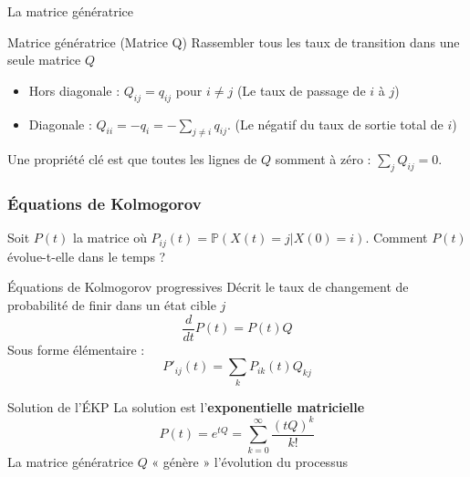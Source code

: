 \documentclass[aspectratio=169]{beamer}\usepackage[]{graphicx}\usepackage[]{xcolor}
\begin{document}
\begin{frame}{La matrice génératrice}
    \begin{block}{Matrice génératrice (Matrice Q)}
        Rassembler tous les taux de transition dans une seule matrice $Q$
        \begin{itemize}
            \item Hors diagonale : $Q_{ij} = q_{ij}$ pour $i \neq j$ (Le taux de passage de $i$ à $j$)
            \item Diagonale : $Q_{ii} = -q_i = -\sum_{j \neq i} q_{ij}$. (Le négatif du taux de sortie total de $i$)
        \end{itemize}
        Une propriété clé est que toutes les lignes de $Q$ somment à zéro : $\sum_{j} Q_{ij} = 0$.
    \end{block}

\end{frame}


\begin{frame}
    \frametitle{Équations de Kolmogorov}
    Soit $P(t)$ la matrice où $P_{ij}(t) = \mathbb{P}(X(t)=j | X(0)=i)$. Comment $P(t)$ évolue-t-elle dans le temps ?
    \vspace{1em}

    \begin{alertblock}{Équations de Kolmogorov progressives}
        Décrit le taux de changement de probabilité de finir dans un état cible $j$
        $$ \frac{d}{dt}P(t) = P(t)Q $$
        Sous forme élémentaire :
        $$ P'_{ij}(t) = \sum_{k} P_{ik}(t) Q_{kj} $$
    \end{alertblock}
\end{frame}

\begin{frame}{Solution de l'ÉKP}
        La solution est l'\textbf{exponentielle matricielle}
        $$ P(t) = e^{tQ} = \sum_{k=0}^{\infty} \frac{(tQ)^k}{k!} $$
        \vfill
        La matrice génératrice $Q$ « génère » l'évolution du processus
\end{frame}
\end{document}
